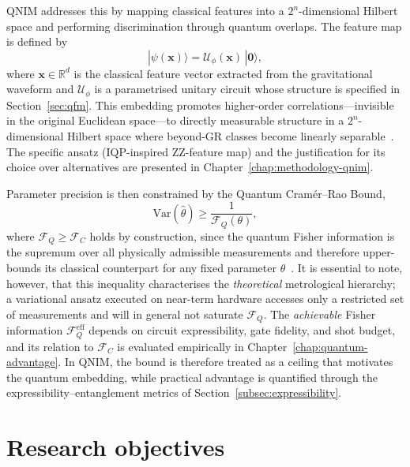 \documentclass[11pt,a4paper, english]{book}
\theoremstyle{plain}
\theoremstyle{definition}
\numberwithin{equation}{chapter}
\numberwithin{figure}{chapter}
\numberwithin{table}{chapter}
\begin{document}
QNIM addresses this by mapping classical features into a $2^n$-dimensional
Hilbert space and performing discrimination through quantum overlaps.
The feature map is defined by
\begin{equation}
  \label{eq:feature_map}
  |\psi(\mathbf{x})\rangle = \mathcal{U}_\phi(\mathbf{x})\,|\mathbf{0}\rangle,
\end{equation}
where $\mathbf{x} \in \mathbb{R}^d$ is the classical feature vector extracted
from the gravitational waveform and $\mathcal{U}_\phi$ is a parametrised
unitary circuit whose structure is specified in
Section~\ref{sec:qfm}.
This embedding promotes higher-order correlations—invisible in the original
Euclidean space—to directly measurable structure in a $2^n$-dimensional
Hilbert space where beyond-GR classes become linearly
separable~\cite{Havlicek_2019}.
The specific ansatz (IQP-inspired ZZ-feature map) and the justification for
its choice over alternatives are presented in
Chapter~\ref{chap:methodology-qnim}.

Parameter precision is then constrained by the Quantum Cram\'{e}r--Rao Bound,
\begin{equation}
  \label{eq:qcrb}
  \mathrm{Var}(\hat{\theta}) \geq \frac{1}{\mathcal{F}_Q(\theta)},
\end{equation}
where $\mathcal{F}_Q \geq \mathcal{F}_C$ holds by construction, since the
quantum Fisher information is the supremum over all physically admissible
measurements and therefore upper-bounds its classical counterpart for any
fixed parameter $\theta$~\cite{Braunstein_1994,Paris_2009}.
It is essential to note, however, that this inequality characterises the
\emph{theoretical} metrological hierarchy; a variational ansatz executed on
near-term hardware accesses only a restricted set of measurements and will in
general not saturate $\mathcal{F}_Q$.
The \emph{achievable} Fisher information $\mathcal{F}_Q^{\mathrm{eff}}$
depends on circuit expressibility, gate fidelity, and shot budget, and its
relation to $\mathcal{F}_C$ is evaluated empirically in
Chapter~\ref{chap:quantum-advantage}.
In QNIM, the bound is therefore treated as a ceiling that motivates the
quantum embedding, while practical advantage is quantified through the
expressibility--entanglement metrics of
Section~\ref{subsec:expressibility}.

\section{Research objectives}
\label{sec:objectives}
\end{document}
